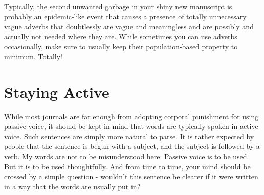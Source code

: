 \documentclass[twocolumn,11pt]{article}
\begin{document}
Typically, the second unwanted garbage in your shiny new manuscript is probably an epidemic-like event that causes a presence of totally unnecessary vague adverbs that doubtlessly are vague and meaningless and are possibly and actually not needed where they are. While sometimes you can use adverbs occasionally, make sure to usually keep their population-based property to minimum. Totally!

\section{Staying Active}

While most journals are far enough from adopting corporal punishment for using passive voice, it should be kept in mind that words are typically spoken in active voice. Such sentences are simply more natural to parse. It is rather expected by people that the sentence is begun with a subject, and the subject is followed by a verb. My words are not to be misunderstood here. Passive voice is to be used. But it is to be used thoughtfully. And from time to time, your mind should be crossed by a simple question - wouldn't this sentence be clearer if it were written in a way that the words are usually put in?

\begin{thebibliography}{50}
\end{thebibliography}
	
\end{document}
